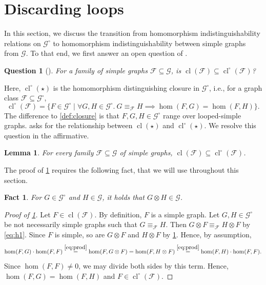 \documentclass[11pt]{scrartcl}
\theoremstyle{definition}
\theoremstyle{plain}
\newtheorem{lemma}[definition]{Lemma}
\newtheorem{question}[definition]{Question}
\newtheorem{fact}[definition]{Fact}
\theoremstyle{remark}
\DeclareMathOperator{\cl}{cl}
\newcommand{\lG}{\mathcal{G}^\circ}
\newcommand{\G}{\mathcal{G}}
\begin{document}
	
	


\section{Discarding loops} \label{sec:loops}

In this section, we discuss the transition from homomorphism indistinguishability relations on $\lG$ to homomorphism indistinguishability between simple graphs from $\G$.
To that end, we first answer an open question of \textcite{roberson_oddomorphisms_2022}.

\begin{question}[{\textcite[Question~1]{roberson_oddomorphisms_2022}}]
    For a family of simple graphs $\mathcal{F} \subseteq \G$,
    is  $\cl(\mathcal{F}) \subseteq \cl^\circ(\mathcal{F})$?\label{question:rob1}
\end{question}

Here, $\cl^\circ(\star)$ is the homomorphism distinguishing closure in $\lG$, i.e., for a graph class $\mathcal{F} \subseteq \lG$,
\[
\cl^\circ(\mathcal{F}) = \{F \in \lG \mid \forall G, H \in \lG.\ G \equiv_{\mathcal{F}} H \implies \hom(F, G) = \hom(F, H)\}.
\]
The difference to \cref{def:closure} is that $F, G, H \in \lG$ range over looped-simple graphs.
 asks for the relationship between $\cl(\star)$ and $\cl^\circ(\star)$.
We resolve this question in the affirmative. 

\begin{lemma}\label{lem:roberson-question}
	For every family $\mathcal{F} \subseteq \G$ of simple graphs,
	$\cl(\mathcal{F}) \subseteq \cl^\circ(\mathcal{F})$.
\end{lemma}

The proof of \cref{lem:roberson-question} requires the following fact, that we will use throughout this section.
\begin{fact}\label{fact:drop-loops}
    For $G \in \lG$ and $H \in \G$, it holds that $G \otimes H \in \G$.
\end{fact}

\begin{proof}[Proof of \cref{lem:roberson-question}]
	Let $F \in \cl(\mathcal{F})$.
	By definition, $F$ is a simple graph.
	Let $G, H \in \lG$ be not necessarily simple graphs such that $G \equiv_{\mathcal{F}} H$.
	Then $G \otimes F \equiv_{\mathcal{F}} H \otimes F$ by \eqref{eq:h1}.
	Since $F$ is simple, so are $G \otimes F$ and $H \otimes F$ by \cref{fact:drop-loops}.
	Hence, by assumption,
	\[
		\hom(F, G) \cdot \hom(F, F)
		\overset{\eqref{eq:prod}}{=} \hom(F, G\otimes F)
		= \hom(F, H \otimes F)
		\overset{\eqref{eq:prod}}{=} \hom(F, H) \cdot \hom(F, F). 
	\]
	Since $\hom(F, F) \neq 0$, we may divide both sides by this term.
	Hence, $\hom(F, G) = \hom(F, H)$ and $F \in \cl^\circ(\mathcal{F})$.
\end{proof}
\end{document}
